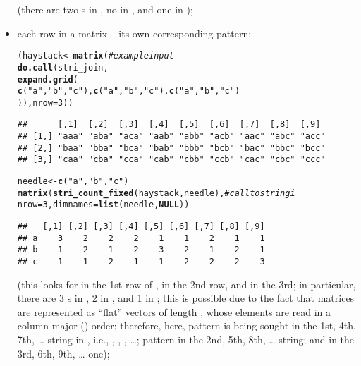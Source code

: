 \documentclass[nojss]{jss}\usepackage[]{graphicx}\usepackage[]{xcolor}
\makeatletter
\newcommand{\hlnum}[1]{\textcolor[rgb]{0.686,0.059,0.569}{#1}}%
\newcommand{\hlstr}[1]{\textcolor[rgb]{0.192,0.494,0.8}{#1}}%
\newcommand{\hlcom}[1]{\textcolor[rgb]{0.678,0.584,0.686}{\textit{#1}}}%
\newcommand{\hlstd}[1]{\textcolor[rgb]{0.345,0.345,0.345}{#1}}%
\newcommand{\hlkwa}[1]{\textcolor[rgb]{0.161,0.373,0.58}{\textbf{#1}}}%
\newcommand{\hlkwb}[1]{\textcolor[rgb]{0.69,0.353,0.396}{#1}}%
\newcommand{\hlkwc}[1]{\textcolor[rgb]{0.333,0.667,0.333}{#1}}%
\newcommand{\hlkwd}[1]{\textcolor[rgb]{0.737,0.353,0.396}{\textbf{#1}}}%
\newenvironment{kframe}{%
 \def\at@end@of@kframe{}%
 \ifinner\ifhmode%
  \def\at@end@of@kframe{\end{minipage}}%
  \begin{minipage}{\columnwidth}%
 \fi\fi%
 \def\FrameCommand##1{\hskip\@totalleftmargin \hskip-\fboxsep
 \colorbox{shadecolor}{##1}\hskip-\fboxsep
     \hskip-\linewidth \hskip-\@totalleftmargin \hskip\columnwidth}%
 \MakeFramed {\advance\hsize-\width
   \@totalleftmargin\z@ \linewidth\hsize
   \@setminipage}}%
 {\par\unskip\endMakeFramed%
 \at@end@of@kframe}
\newenvironment{knitrout}{}{} %
\makeatother
\begin{document}
\begin{itemize}
(there are two s in ,
no  in , and one  in );

\item each row in a matrix -- its own corresponding pattern:

\begin{knitrout}
\color{fgcolor}\begin{kframe}
\begin{alltt}
\hlstd{(haystack} \hlkwb{<-} \hlkwd{matrix}\hlstd{(}  \hlcom{# example input}
  \hlkwd{do.call}\hlstd{(stri_join,}
    \hlkwd{expand.grid}\hlstd{(}
      \hlkwd{c}\hlstd{(}\hlstr{"a"}\hlstd{,} \hlstr{"b"}\hlstd{,} \hlstr{"c"}\hlstd{),} \hlkwd{c}\hlstd{(}\hlstr{"a"}\hlstd{,} \hlstr{"b"}\hlstd{,} \hlstr{"c"}\hlstd{),} \hlkwd{c}\hlstd{(}\hlstr{"a"}\hlstd{,} \hlstr{"b"}\hlstd{,} \hlstr{"c"}\hlstd{)}
    \hlstd{)),} \hlkwc{nrow}\hlstd{=}\hlnum{3}\hlstd{))}
\end{alltt}
\begin{verbatim}
##      [,1]  [,2]  [,3]  [,4]  [,5]  [,6]  [,7]  [,8]  [,9] 
## [1,] "aaa" "aba" "aca" "aab" "abb" "acb" "aac" "abc" "acc"
## [2,] "baa" "bba" "bca" "bab" "bbb" "bcb" "bac" "bbc" "bcc"
## [3,] "caa" "cba" "cca" "cab" "cbb" "ccb" "cac" "cbc" "ccc"
\end{verbatim}
\begin{alltt}
\hlstd{needle} \hlkwb{<-} \hlkwd{c}\hlstd{(}\hlstr{"a"}\hlstd{,} \hlstr{"b"}\hlstd{,} \hlstr{"c"}\hlstd{)}
\hlkwd{matrix}\hlstd{(}\hlkwd{stri_count_fixed}\hlstd{(haystack, needle),}  \hlcom{# call to stringi}
  \hlkwc{nrow}\hlstd{=}\hlnum{3}\hlstd{,} \hlkwc{dimnames}\hlstd{=}\hlkwd{list}\hlstd{(needle,} \hlkwa{NULL}\hlstd{))}
\end{alltt}
\begin{verbatim}
##   [,1] [,2] [,3] [,4] [,5] [,6] [,7] [,8] [,9]
## a    3    2    2    2    1    1    2    1    1
## b    1    2    1    2    3    2    1    2    1
## c    1    1    2    1    1    2    2    2    3
\end{verbatim}
\end{kframe}
\end{knitrout}

(this looks for  in the 1st row of
,  in the 2nd row, and  in the 3rd;
in particular, there are 3 s in , 2 in ,
and 1  in ;
this is possible due to the fact that matrices are
represented as ``flat'' vectors of length ,
whose elements are read in a column-major () order;
therefore, here,
pattern  is being sought in the 1st, 4th, 7th,
\dots{} string in , i.e., , , , \dots;
pattern  in the 2nd, 5th, 8th, \dots{} string;
and  in the 3rd, 6th, 9th, \dots{} one);


\end{itemize}
\end{document}
